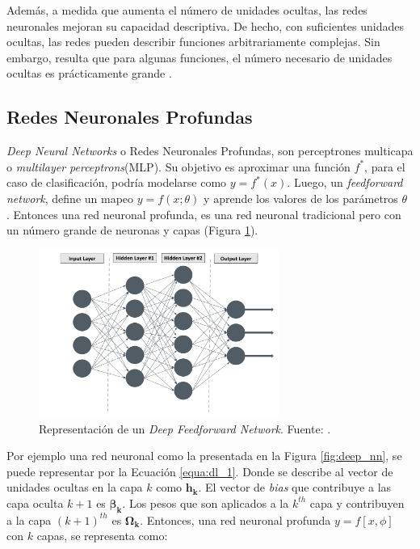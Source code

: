 Además, a medida que aumenta el número de unidades ocultas, las redes neuronales  mejoran su capacidad descriptiva. De hecho, con suficientes unidades ocultas, las redes  pueden describir funciones arbitrariamente complejas. Sin embargo, resulta que para algunas funciones, el número necesario de unidades ocultas es prácticamente grande \cite{prince2023understanding}. 




\subsection{Redes Neuronales Profundas}

\textit{Deep Neural Networks} o Redes Neuronales Profundas,  son perceptrones multicapa o \textit{multilayer perceptrons}(MLP). Su objetivo es aproximar una función $f^*$, para el caso de clasificación, podría modelarse como $ y=f^*(x)$. Luego, un \textit{feedforward network}, define un mapeo $y = f(x;\theta)$ y aprende los valores de los parámetros $\theta$ \cite{Goodfellow2016}. Entonces una red neuronal profunda, es una red neuronal tradicional pero con un número grande de neuronas y capas (Figura \ref{fig:dnn}). 

\begin{figure}[]
	\centering
	\includegraphics[width=0.7\textwidth]{../img/neoantigen/deep_nn}
	\caption{Representación de un \textit{Deep Feedforward Network}. Fuente: \cite{el2022machine}.}
	\label{fig:dnn}
\end{figure}


Por ejemplo una red neuronal como la presentada en la Figura \ref{fig:deep_nn}, se puede representar por la Ecuación \ref{equa:dl_1}. Donde se describe al vector de unidades ocultas en la capa $k$ como $\mathbf{h_k}$. El vector de \textit{bias} que contribuye a las capa oculta $k+1$ es $\mathbf{\beta_k}$. Los pesos que son aplicados a la $k^{th}$ capa y contribuyen a la capa $(k+1)^{th}$ es $\mathbf{\Omega_k}$. Entonces, una red neuronal profunda $y = f[x, \phi]$ con $k$ capas, se representa como:

